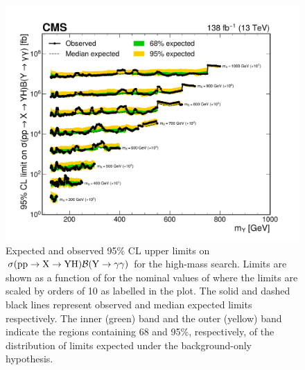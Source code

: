\begin{figure}
    \centering
    \includegraphics[width=\textwidth]{Figures/Dihiggs/results/limits/limits_stack_mx_y_gg_high_mass_paper.pdf}
    \caption[High-Mass \XYggHtt Upper Limits in as Function of \mY in Slices of \mX]{Expected and observed 95\% CL upper limits on $\sigma(\mathrm{p}\mathrm{p} \to \mathrm{X} \to \mathrm{Y}\mathrm{H})\mathcal{B}(\mathrm{Y} \to \gamma\gamma)$ for the high-mass \XYggHtt search. Limits are shown as a function of \mY for the nominal values of \mX where the limits are scaled by orders of 10 as labelled in the plot. The solid and dashed black lines represent observed and median expected limits respectively. The inner (green) band and the outer (yellow) band indicate the regions containing 68 and 95\%, respectively, of the distribution of limits expected under the background-only hypothesis.}\label{fig:limits_stack_mx_y_gg_high_mass}
\end{figure}

